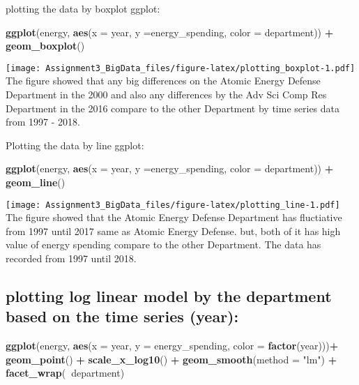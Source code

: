 \documentclass[]{article}
\newenvironment{Shaded}{\begin{snugshade}}{\end{snugshade}}
\newcommand{\KeywordTok}[1]{\textcolor[rgb]{0.13,0.29,0.53}{\textbf{#1}}}
\newcommand{\DataTypeTok}[1]{\textcolor[rgb]{0.13,0.29,0.53}{#1}}
\newcommand{\StringTok}[1]{\textcolor[rgb]{0.31,0.60,0.02}{#1}}
\newcommand{\OperatorTok}[1]{\textcolor[rgb]{0.81,0.36,0.00}{\textbf{#1}}}
\newcommand{\NormalTok}[1]{#1}
\begin{document}
plotting the data by boxplot ggplot:

\begin{Shaded}
\begin{Highlighting}[]
\KeywordTok{ggplot}\NormalTok{(energy, }\KeywordTok{aes}\NormalTok{(}\DataTypeTok{x =}\NormalTok{ year, }\DataTypeTok{y =}\NormalTok{energy_spending, }\DataTypeTok{color =}\NormalTok{ department)) }\OperatorTok{+}
\StringTok{   }\KeywordTok{geom_boxplot}\NormalTok{()}
\end{Highlighting}
\end{Shaded}

\texttt{[image: Assignment3\_BigData\_files/figure-latex/plotting\_boxplot-1.pdf]}
The figure showed that any big differences on the Atomic Energy Defense
Department in the 2000 and also any differences by the Adv Sci Comp Res
Department in the 2016 compare to the other Department by time series
data from 1997 - 2018.

Plotting the data by line ggplot:

\begin{Shaded}
\begin{Highlighting}[]
\KeywordTok{ggplot}\NormalTok{(energy, }\KeywordTok{aes}\NormalTok{(}\DataTypeTok{x =}\NormalTok{ year, }\DataTypeTok{y =}\NormalTok{energy_spending, }\DataTypeTok{color =}\NormalTok{ department)) }\OperatorTok{+}
\StringTok{   }\KeywordTok{geom_line}\NormalTok{()}
\end{Highlighting}
\end{Shaded}

\texttt{[image: Assignment3\_BigData\_files/figure-latex/plotting\_line-1.pdf]}
The figure showed that the Atomic Energy Defense Department has
fluctiative from 1997 until 2017 same as Atomic Energy Defense. but,
both of it has high value of energy spending compare to the other
Department. The data has recorded from 1997 until 2018.

\subsection{plotting log linear model by the department based on the
time series
(year):}\label{plotting-log-linear-model-by-the-department-based-on-the-time-series-year-1}

\begin{Shaded}
\begin{Highlighting}[]
\KeywordTok{ggplot}\NormalTok{(energy, }\KeywordTok{aes}\NormalTok{(}\DataTypeTok{x =}\NormalTok{ year, }\DataTypeTok{y =}\NormalTok{ energy_spending, }\DataTypeTok{color =} \KeywordTok{factor}\NormalTok{(year)))}\OperatorTok{+}
\StringTok{  }\KeywordTok{geom_point}\NormalTok{() }\OperatorTok{+}\StringTok{ }\KeywordTok{scale_x_log10}\NormalTok{() }\OperatorTok{+}\StringTok{ }\KeywordTok{geom_smooth}\NormalTok{(}\DataTypeTok{method =} \StringTok{"lm"}\NormalTok{) }\OperatorTok{+}\StringTok{ }\KeywordTok{facet_wrap}\NormalTok{(}\OperatorTok{~}\NormalTok{department)}
\end{Highlighting}
\end{Shaded}
\end{document}
